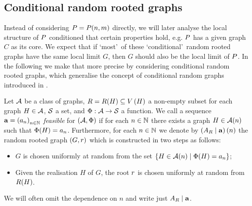 \subsection{Conditional random rooted graphs}\label{LSsub:conditional_random_graphs}
Instead of considering $P=P(n,m)$ directly, we will later analyse the local structure of $P$ conditioned that certain properties hold, e.g. $P$ has a given graph $C$ as its core. We expect that if \lq most\rq\ of these \lq conditional\rq\ random rooted graphs have the same local limit $G$, then $G$ should also be the local limit of $P$. In the following we make that more precise by considering conditional random rooted graphs, which generalise the concept of conditional random graphs introduced in \cite[Section 3.4]{KangMissethan2021}.
\begin{definition}
Let $\mathcal{A}$ be a class of graphs, $R=R(H)\subseteq V\left(H\right)$ a non-empty subset for each graph $H\in\mathcal{A}$, $\mathcal{S}$ a set, and $\Phi:\mathcal{A}\to \mathcal{S}$ a function. We call a sequence $\mathbf{a}=\left(a_n\right)_{n\in\mathbb{N}}$ {\em feasible} for $\left(\mathcal{A}, \Phi\right)$ if for each $n\in\mathbb{N}$ there exists a graph $H\in\mathcal{A}(n)$ such that $\Phi(H)=a_n$. Furthermore, for each $n\in\mathbb{N}$ we denote by $\left(A_{R} \mid \mathbf{a}\right)(n)$ the random rooted graph $\left(G, r\right)$ which is constructed in two steps as follows:
\begin{itemize}
	\item
	$G$ is chosen uniformly at random from the set $\left\{H\in\mathcal{A}(n) \mid \Phi(H)=a_n\right\}$;
	\item
	Given the realisation $H$ of $G$, the root $r$ is chosen uniformly at random from $R(H)$.
\end{itemize} 
We will often omit the dependence on $n$ and write just $A_{R} \mid \mathbf{a}$.
\end{definition}

